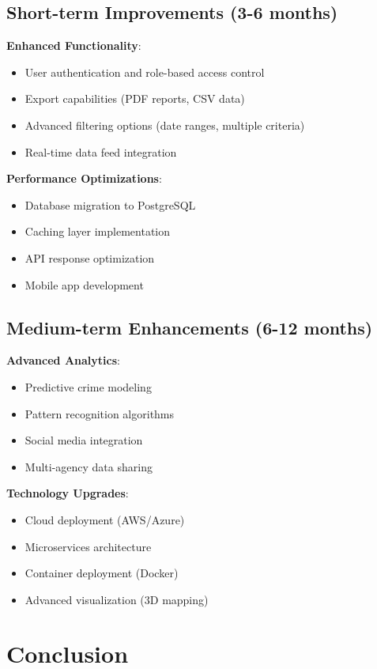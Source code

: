 \documentclass[12pt,a4paper]{article}
\begin{document}
\subsection{Short-term Improvements (3-6 months)}

\textbf{Enhanced Functionality}:
\begin{itemize}
    \item User authentication and role-based access control
    \item Export capabilities (PDF reports, CSV data)
    \item Advanced filtering options (date ranges, multiple criteria)
    \item Real-time data feed integration
\end{itemize}

\textbf{Performance Optimizations}:
\begin{itemize}
    \item Database migration to PostgreSQL
    \item Caching layer implementation
    \item API response optimization
    \item Mobile app development
\end{itemize}

\subsection{Medium-term Enhancements (6-12 months)}

\textbf{Advanced Analytics}:
\begin{itemize}
    \item Predictive crime modeling
    \item Pattern recognition algorithms
    \item Social media integration
    \item Multi-agency data sharing
\end{itemize}

\textbf{Technology Upgrades}:
\begin{itemize}
    \item Cloud deployment (AWS/Azure)
    \item Microservices architecture
    \item Container deployment (Docker)
    \item Advanced visualization (3D mapping)
\end{itemize}

\section{Conclusion}
\end{document}
